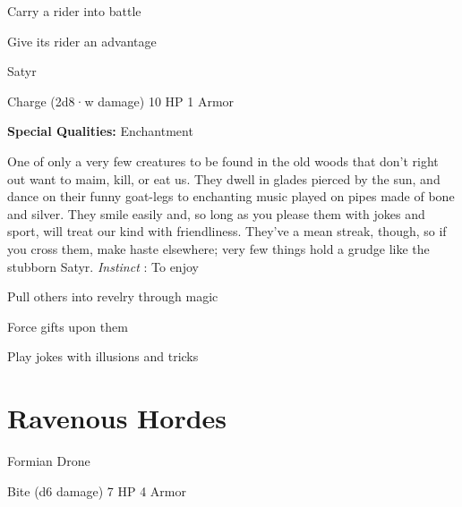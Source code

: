 \startitemize[1,packed]
         
\item Carry a rider into battle

         
\item Give its rider an advantage

       
\stopitemize
       
\startMonsterName
Satyr	 
\stopMonsterName
       

Charge (2d8·w damage)	10 HP	1 Armor

       


       
\startMonsterQualities
         {\bf Special Qualities:}  Enchantment
\stopMonsterQualities
       
\startMonsterDescription
One of only a very few creatures to be found in the old woods that don’t right out want to maim, kill, or eat us. They dwell in glades pierced by the sun, and dance on their funny goat-legs to enchanting music played on pipes made of bone and silver. They smile easily and, so long as you please them with jokes and sport, will treat our kind with friendliness. They’ve a mean streak, though, so if you cross them, make haste elsewhere; very few things hold a grudge like the stubborn Satyr. {\em Instinct} : To enjoy
\stopMonsterDescription
       
\startitemize[1,packed]
         
\item Pull others into revelry through magic

         
\item Force gifts upon them

         
\item Play jokes with illusions and tricks

       
\stopitemize
                
\section{Ravenous Hordes}    
            
\startMonsterName
Formian Drone	 
\stopMonsterName
       

Bite (d6 damage)	7 HP	4 Armor

       


